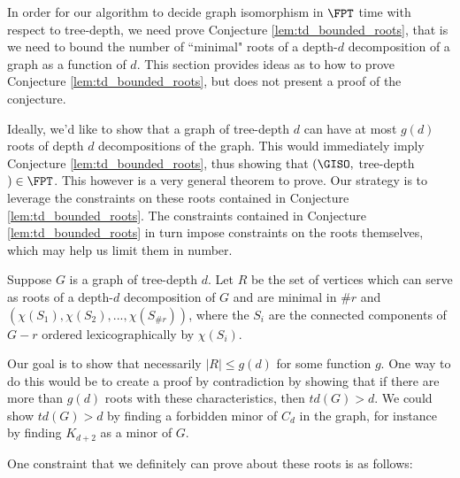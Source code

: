 \documentclass[11pt]{report}
\begin{document}
In order for our algorithm to decide graph isomorphism in $\FPT$ time with respect to tree-depth, we need prove Conjecture \ref{lem:td_bounded_roots}, that is we need to bound the number of ``minimal" roots of a depth-$d$ decomposition of a graph as a function of $d$. This section provides ideas as to how to prove Conjecture \ref{lem:td_bounded_roots}, but does not present a proof of the conjecture.

Ideally, we'd like to show that a graph of tree-depth $d$ can have at most $g(d)$ roots of depth $d$ decompositions of the graph. This would immediately imply Conjecture \ref{lem:td_bounded_roots}, thus showing that $(\GISO,$ tree-depth$)\in\FPT$. This however is a very general theorem to prove. Our strategy is to leverage the constraints on these roots contained in Conjecture \ref{lem:td_bounded_roots}. The constraints contained in Conjecture \ref{lem:td_bounded_roots} in turn impose constraints on the roots themselves, which may help us limit them in number.


Suppose $G$ is a graph of tree-depth $d$. Let $ R $ be the set of vertices which can serve as roots of a depth-$d$ decomposition of $G$ and are minimal in $\# r$ and $(\chi(S_1), \chi(S_2), ...,\chi (S_{\# r}))$, where the $S_i$ are the connected components of $G-r$ ordered lexicographically by $\chi(S_i)$. 

Our goal is to show that necessarily $|R|\leq g(d)$ for some function $g$. One way to do this would be to create a proof by contradiction by showing that if there are more than $g(d)$ roots with these characteristics, then $td(G)>d$. We could show $td(G)>d$ by finding a forbidden minor of $C_d$ in the graph, for instance by finding $K_{d+2}$ as a minor of $G$.

One constraint that we definitely can prove about these roots is as follows:
\end{document}
